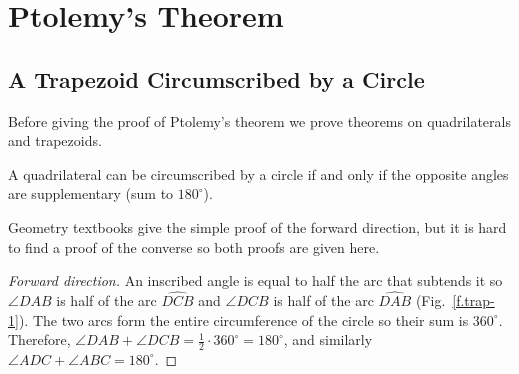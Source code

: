 
\section{Ptolemy's Theorem}\label{a.ptolemy}


\subsection{A Trapezoid Circumscribed by a Circle}\label{s.circumscribed}

Before giving the proof of Ptolemy's theorem we prove theorems on quadrilaterals and trapezoids.

\begin{theorem}\label{thm.quad-circum}
A quadrilateral can be circumscribed by a circle if and only if the opposite angles are supplementary (sum to $180^\circ$).
\end{theorem}

Geometry textbooks give the simple proof of the forward direction, but it is hard to find a proof of the converse so both proofs are given here.

\begin{proof}[Forward direction]
An inscribed angle is equal to half the arc that subtends it so $\angle DAB$ is half of the arc $\widehat{DCB}$ and $\angle DCB$ is half of the arc $\widehat{DAB}$ (Fig.~\ref{f.trap-1}). The two arcs form the entire circumference of the circle so their sum is $360^\circ$. Therefore, $\angle DAB + \angle DCB = \frac{1}{2} \cdot 360^\circ =  180^\circ$, and similarly $\angle ADC + \angle ABC = 180^\circ$.

\end{proof}

